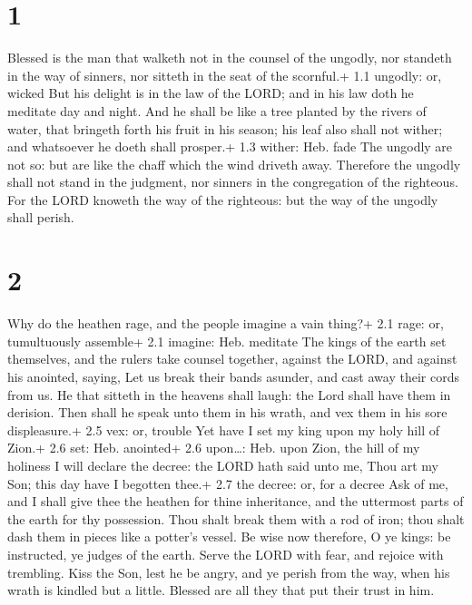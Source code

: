 \hypertarget{section}{%
\section{1}\label{section}}

 Blessed is the man that walketh not in the counsel of the
ungodly, nor standeth in the way of sinners, nor sitteth in the seat of
the scornful.+ 1.1 ungodly: or, wicked  But his delight is
in the law of the LORD; and in his law doth he meditate day and night.
 And he shall be like a tree planted by the rivers of water,
that bringeth forth his fruit in his season; his leaf also shall not
wither; and whatsoever he doeth shall prosper.+ 1.3 wither: Heb. fade
 The ungodly are not so: but are like the chaff which the
wind driveth away.  Therefore the ungodly shall not stand in
the judgment, nor sinners in the congregation of the righteous.
 For the LORD knoweth the way of the righteous: but the way
of the ungodly shall perish.

\hypertarget{section-1}{%
\section{2}\label{section-1}}

 Why do the heathen rage, and the people imagine a vain
thing?+ 2.1 rage: or, tumultuously assemble+ 2.1 imagine: Heb. meditate
 The kings of the earth set themselves, and the rulers take
counsel together, against the LORD, and against his anointed, saying,
 Let us break their bands asunder, and cast away their cords
from us.  He that sitteth in the heavens shall laugh: the
Lord shall have them in derision.  Then shall he speak unto
them in his wrath, and vex them in his sore displeasure.+ 2.5 vex: or,
trouble  Yet have I set my king upon my holy hill of Zion.+
2.6 set: Heb. anointed+ 2.6 upon\ldots: Heb. upon Zion, the hill of my
holiness  I will declare the decree: the LORD hath said unto
me, Thou art my Son; this day have I begotten thee.+ 2.7 the decree: or,
for a decree  Ask of me, and I shall give thee the heathen
for thine inheritance, and the uttermost parts of the earth for thy
possession.  Thou shalt break them with a rod of iron; thou
shalt dash them in pieces like a potter's vessel.  Be wise
now therefore, O ye kings: be instructed, ye judges of the earth.
 Serve the LORD with fear, and rejoice with trembling.
 Kiss the Son, lest he be angry, and ye perish from the
way, when his wrath is kindled but a little. Blessed are all they that
put their trust in him.

